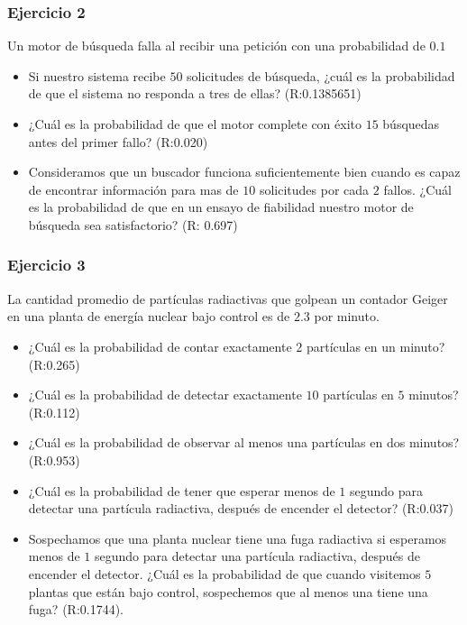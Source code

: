 \documentclass[
]{book}
\begin{document}
\hypertarget{ejercicio-2-4}{%
\subsubsection{Ejercicio 2}\label{ejercicio-2-4}}

Un motor de búsqueda falla al recibir una petición con una probabilidad de \(0.1\)

\begin{itemize}
\item
  Si nuestro sistema recibe \(50\) solicitudes de búsqueda, ¿cuál es la probabilidad de que el sistema no responda a tres de ellas? (R:0.1385651)
\item
  ¿Cuál es la probabilidad de que el motor complete con éxito \(15\) búsquedas antes del primer fallo? (R:0.020)
\item
  Consideramos que un buscador funciona suficientemente bien cuando es capaz de encontrar información para mas de \(10\) solicitudes por cada \(2\) fallos. ¿Cuál es la probabilidad de que en un ensayo de fiabilidad nuestro motor de búsqueda sea satisfactorio?
  (R: 0.697)
\end{itemize}

\hypertarget{ejercicio-3-2}{%
\subsubsection{Ejercicio 3}\label{ejercicio-3-2}}

La cantidad promedio de partículas radiactivas que golpean un contador Geiger en una planta de energía nuclear bajo control es de \(2.3\) por minuto.

\begin{itemize}
\item
  ¿Cuál es la probabilidad de contar exactamente \(2\) partículas en un minuto? (R:0.265)
\item
  ¿Cuál es la probabilidad de detectar exactamente \(10\) partículas en \(5\) minutos? (R:0.112)
\item
  ¿Cuál es la probabilidad de observar al menos una partículas en dos minutos? (R:0.953)
\item
  ¿Cuál es la probabilidad de tener que esperar menos de \(1\) segundo para detectar una partícula radiactiva, después de encender el detector? (R:0.037)
\item
  Sospechamos que una planta nuclear tiene una fuga radiactiva si esperamos menos de \(1\) segundo para detectar una partícula radiactiva, después de encender el detector. ¿Cuál es la probabilidad de que cuando visitemos \(5\) plantas que están bajo control, sospechemos que al menos una tiene una fuga? (R:0.1744).
\end{itemize}
\end{document}
